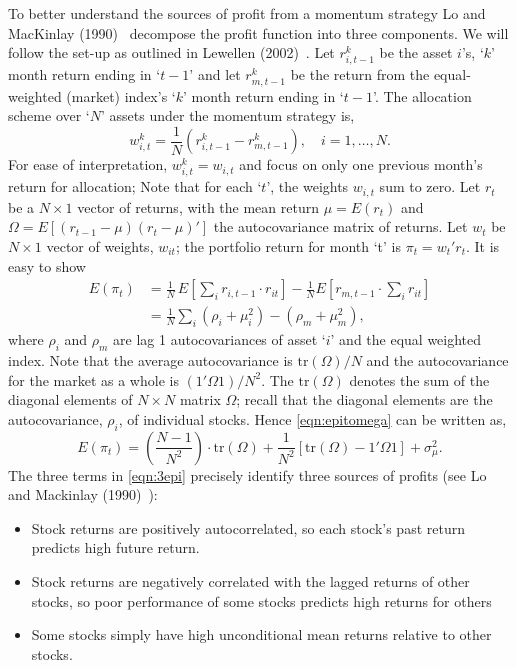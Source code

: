 To better understand the sources of profit from a momentum strategy Lo and MacKinlay (1990)~\cite{lo1990} decompose the profit function into three components. We will follow the set-up as outlined in Lewellen (2002)~\cite{lew2002}. Let $r_{i,t-1}^k$ be the asset $i$'s, `$k$' month return ending in `$t-1$' and let $r_{m,t-1}^k$ be the return from the equal-weighted (market) index's `$k$' month return ending in `$t-1$'. The allocation scheme over `$N$' assets under the momentum strategy is,
	\begin{equation} \label{eqn:witkrdiff}
	w_{i,t}^k= \frac{1}{N} (r_{i,t-1}^k - r_{m,t-1}^k), \quad i= 1,\ldots, N.
	\end{equation}
For ease of interpretation, $w_{i,t}^k = w_{i,t}$ and focus on only one previous month's return for allocation; Note that for each `$t$', the weights $w_{i,t}$ sum to zero. Let $r_t$ be a $N \times 1$ vector of returns, with the mean return $\mu = E(r_t)$ and $\Omega = E[(r_{t-1} - \mu)(r_t - \mu)']$ the autocovariance matrix of returns. Let $w_t$ be $N \times 1$ vector of weights, $w_{it}$; the portfolio return for month `t' is $\pi_t = w_t'r_t$. It is easy to show
	\begin{equation} \label{eqn:epitomega}
	\begin{split}
	E(\pi_t)&= \frac{1}{N}\, E\left[\sum_i r_{i,t-1} \cdot r_{it} \right] - \frac{1}{N} E\left[r_{m,t-1} \cdot \sum_i r_{it} \right] \\
	&= \frac{1}{N}\sum_i (\rho_i + \mu_i^2) - (\rho_m + \mu_m^2),
	\end{split}
	\end{equation}
where $\rho_i$ and $\rho_m$ are lag 1 autocovariances of asset `$i$' and the equal weighted index. Note that the average autocovariance is $\text{tr}(\Omega)/N$ and the autocovariance for the market as a whole is $(1' \Omega 1)/N^2$. The $\text{tr}(\Omega)$ denotes the sum of the diagonal elements of $N \times N$ matrix $\Omega$; recall that the diagonal elements are the autocovariance, $\rho_i$, of individual stocks. Hence \eqref{eqn:epitomega} can be written as,
	\begin{equation} \label{eqn:3epi}
	E(\pi_t) = \left(\frac{N-1}{N^2}\right)\cdot \text{tr}(\Omega) + \frac{1}{N^2} [\text{tr}(\Omega) - 1' \Omega 1] + \sigma_{\mu}^2.
	\end{equation}
The three terms in \eqref{eqn:3epi} precisely identify three sources of profits (see Lo and Mackinlay (1990)~\cite{lo1990}):


\begin{itemize}
\item Stock returns are positively autocorrelated, so each stock's past return predicts high future return.
\item Stock returns are negatively correlated with the lagged returns of other stocks, so poor performance of some stocks predicts high returns for others
\item Some stocks simply have high unconditional mean returns relative to other stocks.
\end{itemize}


